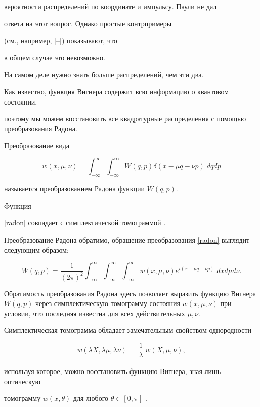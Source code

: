 вероятности распределений по координате и импульсу. Паули не дал

ответа на этот вопрос. Однако простые контрпримеры 

(см., например, [--]) показывают, что

в общем случае это невозможно. 

На самом деле нужно знать больше распределений, чем эти два.



Как известно, функция Вигнера содержит всю информацию о квантовом состоянии,

 поэтому мы можем восстановить все квадратурные распределения с помощью преобразования Радона.



Преобразование вида

\begin{equation}\label{radon}

w(x,\mu,\nu)= { \int_{-\infty}^{\infty} \int_{-\infty}^{\infty}} W(q,p)\delta(x-\mu q-\nu p)\;dqdp

\end{equation}

называется преобразованием Радона \cite{radon} функции $W(q,p)$. 

Функция

 \eqref{radon} совпадает с симплектической томограммой \cite{manko}.

 Преобразование Радона обратимо, обращение преобразования \eqref{radon} выглядит следующим образом:

$$

W(q,p)=\frac{1}{(2\pi)^2} {\int_{-\infty}^{\infty} \int_{-\infty}^{\infty} \int_{-\infty}^{\infty}} w(x,\mu,\nu)e^{i(x-\mu q-\nu p)}\;dxd\mu d\nu.

$$

Обратимость преобразования Радона здесь позволяет выразить функцию Вигнера  $W(q,p)$ через симплектическую томограмму состояния $w(x,\mu,\nu)$ при условии, что последняя известна для всех действительных $\mu,\nu$. 

Симплектическая томограмма обладает замечательным свойством однородности

$$w(\lambda X,\lambda\mu,\lambda\nu)=\frac{1}{|\lambda|}w(X,\mu,\nu),

$$

 используя которое, можно восстановить функцию Вигнера, зная лишь оптическую 

 томограмму $w(x,\theta)$ для любого $\theta \in [0, \pi]$ \cite{dariano,leonhardt2}. 

